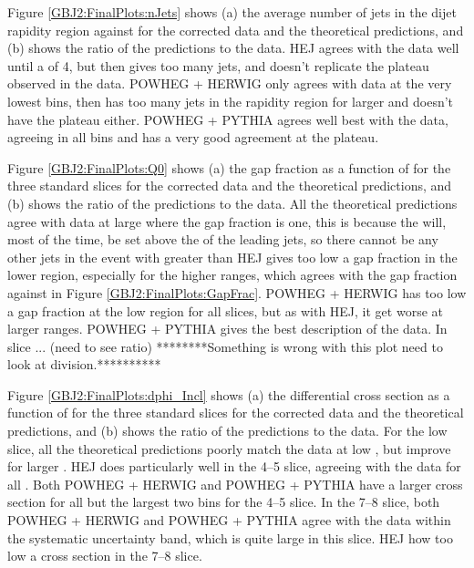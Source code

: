 Figure \ref{GBJ2:FinalPlots:nJets} shows (a) the average number of jets in the dijet rapidity region against \dy{} for the corrected data and the theoretical predictions, and (b) shows the ratio of the predictions to the data.
HEJ agrees with the data well until a \dy{} of 4, but then gives too many jets, and doesn't replicate the plateau observed in the data. 
POWHEG + HERWIG only agrees with data at the very lowest \dy{} bins, then has too many jets in the rapidity region for larger \dy{} and doesn't have the plateau either.
POWHEG + PYTHIA agrees well best with the data, agreeing in all \dy{} bins and has a very good agreement at the plateau.

Figure \ref{GBJ2:FinalPlots:Q0} shows (a) the gap fraction as a function of \qz{} for the three standard \dy{} slices for the corrected data and the theoretical predictions, and (b) shows the ratio of the predictions to the data.
All the theoretical predictions agree with data at large \qz{} where the gap fraction is one, this is because the \qz{} will, most of the time, be set above the \pt{} of the leading jets, so there cannot be any other jets in the event with \pt{} greater than \qz{}
HEJ gives too low a gap fraction in the lower \qz{} region, especially for the higher \dy{} ranges, which agrees with the gap fraction against \dy{} in Figure \ref{GBJ2:FinalPlots:GapFrac}.
POWHEG + HERWIG has too low a gap fraction at the low \qz{} region for all \dy{} slices, but as with HEJ, it get worse at larger \dy{} ranges.
POWHEG + PYTHIA gives the best description of the data. In slice ... (need to see ratio)
********Something is wrong with this plot need to look at division.**********


Figure \ref{GBJ2:FinalPlots:dphi_Incl} shows (a) the differential cross section as a function of \dphi{} for the three standard \dy{} slices for the corrected data and the theoretical predictions, and (b) shows the ratio of the predictions to the data.
For the low \dy{} slice, all the theoretical predictions poorly match the data at low \dphi{}, but improve for larger \dphi{}.
HEJ does particularly well in the 4--5 \dy{} slice, agreeing with the data for all \dphi{}.
Both POWHEG + HERWIG and POWHEG + PYTHIA have a larger cross section for all but the largest two \dphi{} bins for the 4--5 \dy{} slice.
In the 7--8 \dy{} slice, both POWHEG + HERWIG and POWHEG + PYTHIA agree with the data within the systematic uncertainty band, which is quite large in this slice.
HEJ how too low a cross section in the 7--8 \dy{} slice. 



